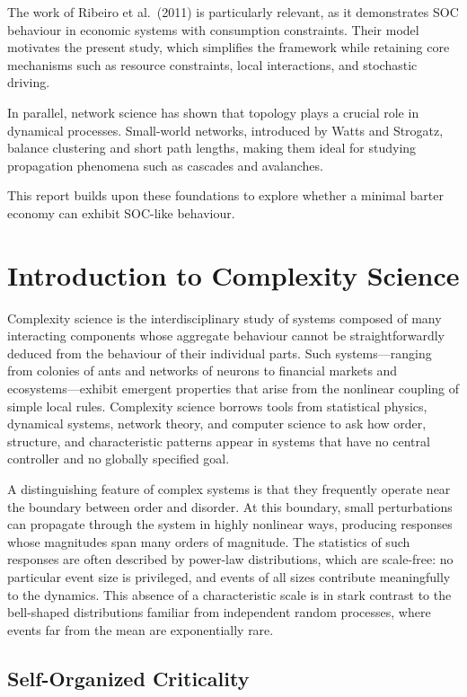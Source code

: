\documentclass[11pt,a4paper]{article}
\begin{document}
The work of Ribeiro et al.\ (2011) is particularly relevant, as it demonstrates
SOC behaviour in economic systems with consumption constraints. Their model
motivates the present study, which simplifies the framework while retaining
core mechanisms such as resource constraints, local interactions, and stochastic
driving.

In parallel, network science has shown that topology plays a crucial role in
dynamical processes. Small-world networks, introduced by Watts and Strogatz,
balance clustering and short path lengths, making them ideal for studying
propagation phenomena such as cascades and avalanches.

This report builds upon these foundations to explore whether a minimal barter
economy can exhibit SOC-like behaviour.
\section{Introduction to Complexity Science}

Complexity science is the interdisciplinary study of systems composed of many
interacting components whose aggregate behaviour cannot be straightforwardly
deduced from the behaviour of their individual parts. Such systems---ranging
from colonies of ants and networks of neurons to financial markets and
ecosystems---exhibit emergent properties that arise from the nonlinear
coupling of simple local rules. Complexity science borrows tools from
statistical physics, dynamical systems, network theory, and computer science
to ask how order, structure, and characteristic patterns appear in systems
that have no central controller and no globally specified goal.

A distinguishing feature of complex systems is that they frequently operate
near the boundary between order and disorder. At this boundary, small
perturbations can propagate through the system in highly nonlinear ways,
producing responses whose magnitudes span many orders of magnitude. The
statistics of such responses are often described by power-law distributions,
which are scale-free: no particular event size is privileged, and events of
all sizes contribute meaningfully to the dynamics. This absence of a
characteristic scale is in stark contrast to the bell-shaped distributions
familiar from independent random processes, where events far from the mean
are exponentially rare.

\subsection{Self-Organized Criticality}
\end{document}
